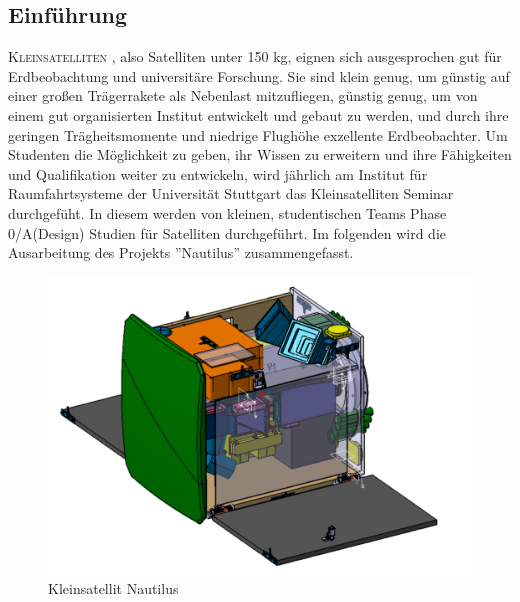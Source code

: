 \documentclass[twoside]{article}
\begin{document}
   \begin{multicols}{2} %


      \section{Einführung}

      \lettrine[nindent=0em,lines=3]{K} {\sc leinsatelliten}
      , also Satelliten unter 150 kg, 
      eignen sich ausgesprochen gut für Erdbeobachtung und universitäre Forschung. 
      Sie sind klein genug, um günstig auf einer großen Trägerrakete als Nebenlast 
      mitzufliegen, günstig genug, um von einem gut organisierten Institut entwickelt 
      und gebaut zu werden, und durch ihre geringen Trägheitsmomente und niedrige 
      Flughöhe exzellente Erdbeobachter. Um Studenten die Möglichkeit zu geben, ihr 
      Wissen zu erweitern und ihre Fähigkeiten und Qualifikation weiter zu 
      entwickeln, wird jährlich am Institut für Raumfahrtsysteme der Universität 
      Stuttgart das Kleinsatelliten Seminar durchgefüht. In diesem werden von kleinen, 
      studentischen Teams Phase 0/A(Design) Studien für Satelliten durchgeführt. 
      Im folgenden wird die Ausarbeitung des Projekts ''Nautilus'' zusammengefasst.
      \begin{figure}[H]
         \captionsetup{format=plain}
         \centering
         \includegraphics[width=\linewidth]{sat.png}       
         \caption{Kleinsatellit Nautilus}
      \end{figure}


\end{multicols}
\end{document}
